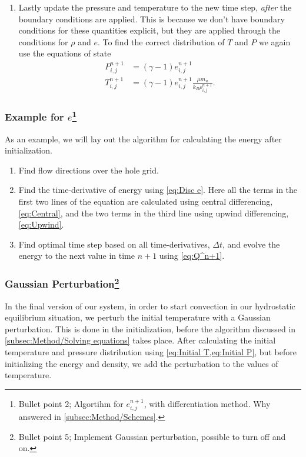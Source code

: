 \documentclass[11pt,a4paper,twocolumn,titlepage]{article}
\begin{document}
\begin{enumerate}
\item Lastly update the pressure and temperature to the new time step, \textit{after} the boundary conditions are applied. This is because we don't have boundary conditions for these quantities explicit, but they are applied through the conditions for $\rho$ and $e$. To find the correct distribution of $T$ and $P$ we again use the equations of state
\begin{equation}
\begin{aligned}
P_{i,j}^{n+1} &= (\gamma-1)e_{i,j}^{n+1}
\\
T_{i,j}^{n+1} &= (\gamma-1)e_{i,j}^{n+1} \frac{\mu m_u }{k_B\rho_{i,j}^{n+1}}.
\end{aligned}
\label{eq:T and P n+1}
\end{equation}
\end{enumerate}

\subsubsection[Example for $e$]{Example for $e$\protect\footnote{Bullet point 2; Algortihm for $e_{i,j}^{n+1}$, with differentiation method. Why answered in \cref{subsec:Method/Schemes}.}}\label{subsubsec:Method/Example w and e}
As an example, we will lay out the algorithm for calculating the energy after initialization.
\begin{enumerate}
\item Find flow directions over the hole grid.

\item Find the time-derivative of energy using \cref{eq:Disc e}. Here all the terms in the first two lines of the equation are calculated using central differencing, \cref{eq:Central}, and the two terms in the third line using upwind differencing, \cref{eq:Upwind}.

\item Find optimal time step based on all time-derivatives, $\Delta t$, and evolve the energy to the next value in time $n+1$ using \cref{eq:Q^n+1}.
\end{enumerate}

\subsubsection[Gaussian Perturbation]{Gaussian Perturbation\protect\footnote{Bullet point 5; Implement Gaussian perturbation, possible to turn off and on.}}\label{subsubsec:Method/Gaussian perturbation}
In the final version of our system, in order to start convection in our hydrostatic equilibrium situation, we perturb the initial temperature with a Gaussian perturbation. This is done in the initialization, before the algorithm discussed in \cref{subsec:Method/Solving equations} takes place. After calculating the initial temperature and pressure distribution using \cref{eq:Initial T,eq:Initial P}, but before initializing the energy and density, we add the perturbation to the values of temperature.
\end{document}
